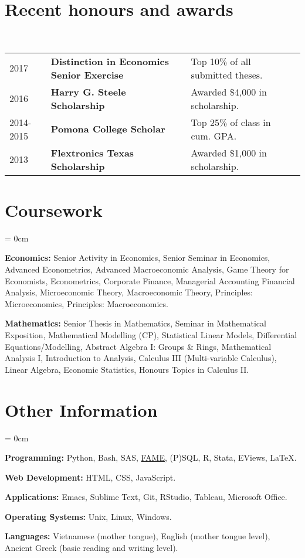 \documentclass[a4paper, 11pt]{article}
\begin{document}
  \section{Recent honours and awards}
    ~\begin{tabular}{lllP{1cm}}
      2017 & \textbf{Distinction in Economics Senior Exercise} & Top 10\% of all submitted theses.\\
      2016 & \textbf{Harry G. Steele Scholarship} & Awarded \$4,000 in scholarship.\\
      2014-2015 & \textbf{Pomona College Scholar} & Top 25\% of class in cum. GPA.\\
      2013 & \textbf{Flextronics Texas Scholarship} & Awarded \$1,000 in scholarship.
    \end{tabular}

  \section{Coursework}
    \begin{compactitem}\parskip = 0cm
      \item \textbf{Economics:} Senior Activity in Economics, Senior Seminar in Economics, Advanced Econometrics, Advanced Macroeconomic Analysis, Game Theory for Economists, Econometrics, Corporate Finance,  Managerial Accounting Financial Analysis, Microeconomic Theory,  Macroeconomic Theory, Principles: Microeconomics, Principles: Macroeconomics.
      \item  \textbf{Mathematics:} Senior Thesis in Mathematics, Seminar in Mathematical Exposition, Mathematical Modelling (CP), Statistical Linear Models, Differential Equations/Modelling, Abstract Algebra I: Groups \& Rings, Mathematical Analysis I, Introduction to Analysis, Calculus III (Multi-variable Calculus), Linear Algebra, Economic Statistics, Honours Topics in Calculus II.
    \end{compactitem}

  \section{Other Information}
    \begin{compactitem}\parskip = 0cm
      \item \textbf{Programming:} Python, Bash, SAS, \href{https://en.wikipedia.org/wiki/FAME_(database)}{FAME}, (P)SQL, R, Stata, EViews, \LaTeX.
      \item \textbf{Web Development:} HTML, CSS, JavaScript.
      \item \textbf{Applications:} Emacs, Sublime Text, Git, RStudio, Tableau, Microsoft Office.
      \item \textbf{Operating Systems:} Unix, Linux, Windows.
      \item \textbf{Languages:} Vietnamese (mother tongue), English (mother tongue level), Ancient Greek (basic reading and writing level).
    \end{compactitem}
\end{document}

